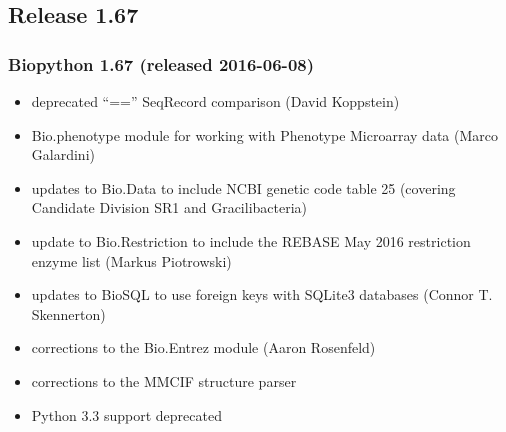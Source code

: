 \documentclass[trans]{beamer}
\begin{document}
\subsection*{Release 1.67}
\frame
{
  \frametitle{Biopython 1.67 (released 2016-06-08)}

  \begin{itemize}
  \item deprecated ``=='' SeqRecord comparison (David Koppstein)
  \item Bio.phenotype module for working with Phenotype Microarray data (Marco Galardini)
  \item updates to Bio.Data to include NCBI genetic code table 25 (covering Candidate Division SR1 and Gracilibacteria)
  \item update to Bio.Restriction to include the REBASE May 2016 restriction enzyme list (Markus Piotrowski)
  \item updates to BioSQL to use foreign keys with SQLite3 databases (Connor T. Skennerton)
  \item corrections to the Bio.Entrez module (Aaron Rosenfeld)
  \item corrections to the MMCIF structure parser
  \item Python 3.3 support deprecated
  \end{itemize}
}
\frame
\end{document}
